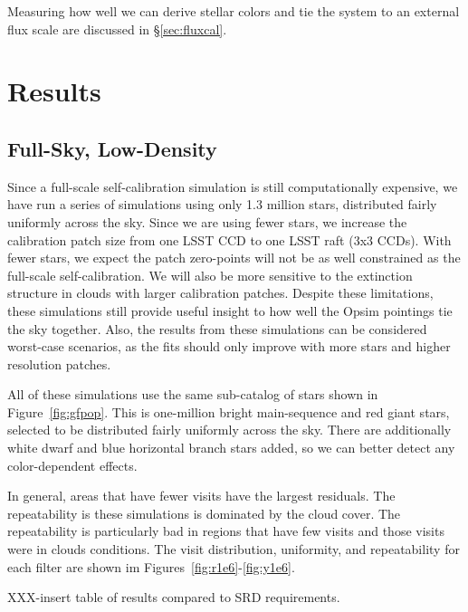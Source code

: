 \documentclass[12pt,preprint]{aastex}
\begin{document}
Measuring how well we can derive stellar colors and tie the system to an external flux scale are discussed in \S\ref{sec:fluxcal}.








\section{Results}



\subsection{Full-Sky, Low-Density}\label{sec:fsld}

Since a full-scale self-calibration simulation is still computationally expensive, we have run a series of simulations using only 1.3 million stars, distributed fairly uniformly across the sky.  Since we are using fewer stars, we increase the calibration patch size from one LSST CCD to one LSST raft (3x3 CCDs).  With fewer stars, we expect the patch zero-points will not be as well constrained as the full-scale self-calibration.  We will also be more sensitive to the extinction structure in clouds with larger calibration patches.  Despite these limitations, these simulations still provide useful insight to how well the Opsim pointings tie the sky together.  Also, the results from these simulations can be considered worst-case scenarios, as the fits should only improve with more stars and higher resolution patches.


All of these simulations use the same sub-catalog of stars shown in Figure~\ref{fig:gfpop}.  This is one-million bright main-sequence and red giant stars, selected to be distributed fairly uniformly across the sky.  There are additionally white dwarf and blue horizontal branch stars added, so we can better detect any color-dependent effects.

In general, areas that have fewer visits have the largest residuals.  The repeatability is these simulations is dominated by the cloud cover.  The repeatability is particularly bad in regions that have few visits and those visits were in clouds conditions.  The visit distribution, uniformity, and repeatability for each filter are shown im Figures~\ref{fig:r1e6}-\ref{fig:y1e6}.

XXX-insert table of results compared to SRD requirements.
\end{document}
